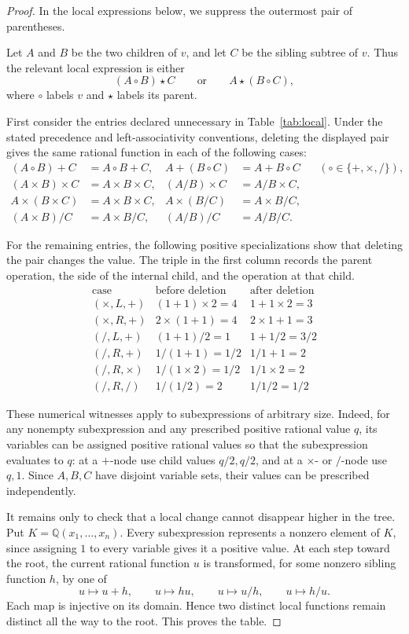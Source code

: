 \documentclass[11pt]{article}
\newcommand{\Q}{\mathbb{Q}}
\begin{document}
\begin{proof}
In the local expressions below, we suppress the outermost pair of
parentheses.

Let $A$ and $B$ be the two children of $v$, and let $C$ be the sibling
subtree of $v$. Thus the relevant local expression is either
\[
 (A\circ B)\star C
 \qquad\text{or}\qquad
 A\star(B\circ C),
\]
where $\circ$ labels $v$ and $\star$ labels its parent.

First consider the entries declared unnecessary in
Table~\ref{tab:local}. Under the stated precedence and
left-associativity conventions, deleting the displayed pair gives the same
rational function in each of the following cases:
\[
\begin{aligned}
 (A\circ B)+C&=A\circ B+C,
 &A+(B\circ C)&=A+B\circ C
 &&(\circ\in\{+,\times,/\}),\\
 (A\times B)\times C&=A\times B\times C,
 &(A/B)\times C&=A/B\times C,\\
 A\times(B\times C)&=A\times B\times C,
 &A\times(B/C)&=A\times B/C,\\
 (A\times B)/C&=A\times B/C,
 &(A/B)/C&=A/B/C.
\end{aligned}
\]

For the remaining entries, the following positive specializations show that
deleting the pair changes the value. The triple in the first column records
the parent operation, the side of the internal child, and the operation at
that child.
\[
\begin{array}{c|c|c}
\text{case} & \text{before deletion} & \text{after deletion}\\
\hline
(\times,L,+) &(1+1)\times2=4&1+1\times2=3\\
(\times,R,+) &2\times(1+1)=4&2\times1+1=3\\
(/,L,+) &(1+1)/2=1&1+1/2=3/2\\
(/,R,+) &1/(1+1)=1/2&1/1+1=2\\
(/,R,\times) &1/(1\times2)=1/2&1/1\times2=2\\
(/,R,/) &1/(1/2)=2&1/1/2=1/2
\end{array}
\]

These numerical witnesses apply to subexpressions of arbitrary size. Indeed,
for any nonempty subexpression and any prescribed positive rational value
$q$, its variables can be assigned positive rational values so that the
subexpression evaluates to $q$: at a $+$-node use child values $q/2,q/2$,
and at a $\times$- or $/$-node use $q,1$. Since $A,B,C$ have disjoint
variable sets, their values can be prescribed independently.

It remains only to check that a local change cannot disappear higher in the
tree. Put $K=\Q(x_1,\ldots,x_n)$. Every subexpression represents a nonzero
element of $K$, since assigning $1$ to every variable gives it a positive
value. At each step toward the root, the current rational function $u$ is
transformed, for some nonzero sibling function $h$, by one of
\[
 u\longmapsto u+h,\qquad
 u\longmapsto hu,\qquad
 u\longmapsto u/h,\qquad
 u\longmapsto h/u.
\]
Each map is injective on its domain. Hence two distinct local functions remain
distinct all the way to the root. This proves the table.
\end{proof}
\end{document}
